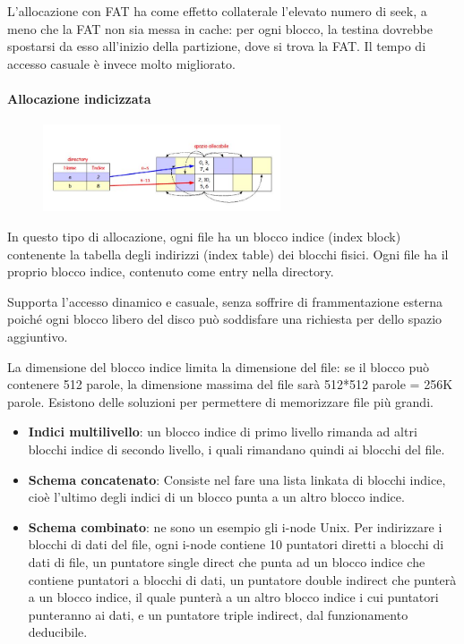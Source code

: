\documentclass[a4paper]{article}
\begin{document}
L'allocazione con FAT ha come effetto collaterale l'elevato numero di seek, a meno che la FAT non sia messa in cache: per ogni blocco, la testina dovrebbe spostarsi da esso all'inizio della partizione, dove si trova la FAT. Il tempo di accesso casuale è invece molto migliorato.

\paragraph{Allocazione indicizzata}
\begin{figure}
    \centering
    \includegraphics[width=7cm]{img/allocind.JPG}
\end{figure}
In questo tipo di allocazione, ogni file ha un blocco indice (index block) contenente la tabella degli indirizzi (index table) dei blocchi fisici. Ogni file ha il proprio blocco indice, contenuto come entry nella directory.

Supporta l'accesso dinamico e casuale, senza soffrire di frammentazione esterna poiché ogni blocco libero del disco può soddisfare una richiesta per dello spazio aggiuntivo.

La dimensione del blocco indice limita la dimensione del file: se il blocco può contenere 512 parole, la dimensione massima del file sarà 512*512 parole = 256K parole. Esistono delle soluzioni per permettere di memorizzare file più grandi.
\begin{itemize}
    \item \textbf{Indici multilivello}: un blocco indice di primo livello rimanda ad altri blocchi indice di secondo livello, i quali rimandano quindi ai blocchi del file.
    \item \textbf{Schema concatenato}: Consiste nel fare una lista linkata di blocchi indice, cioè l'ultimo degli indici di un blocco punta a un altro blocco indice.
    \item \textbf{Schema combinato}: ne sono un esempio gli i-node Unix. Per indirizzare i blocchi di dati del file, ogni i-node contiene 10 puntatori diretti a blocchi di dati di file, un puntatore single direct che punta ad un blocco indice che contiene puntatori a blocchi di dati, un puntatore double indirect che punterà a un blocco indice, il quale punterà a un altro blocco indice i cui puntatori punteranno ai dati, e un puntatore triple indirect, dal funzionamento deducibile.
\end{itemize}
\end{document}
